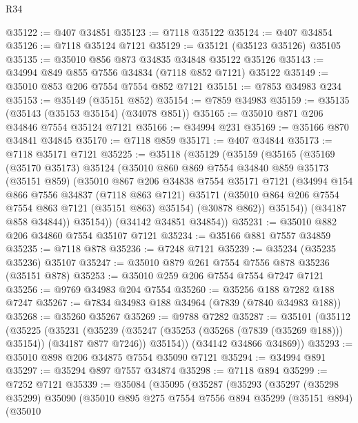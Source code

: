 \begin{lexlean}{R34}
\begin{coremodule}
@35122 := @407 @34851
@35123 := @7118 @35122
@35124 := @407 @34854
@35126 := @7118 @35124 @7121
@35129 := @35121 (@35123 @35126) @35105
@35135 := @35010 @856 @873 @34835 @34848 @35122 @35126
@35143 := @34994 @849 @855 @7556 @34834 (@7118 @852 @7121) @35122
@35149 := @35010 @853 @206 @7554 @7554 @852 @7121
@35151 := @7853 @34983 @234
@35153 := @35149 (@35151 @852)
@35154 := @7859 @34983
@35159 := @35135 (@35143 (@35153 @35154) (@34078 @851))
@35165 := @35010 @871 @206 @34846 @7554 @35124 @7121
@35166 := @34994 @231
@35169 := @35166 @870 @34841 @34845
@35170 := @7118 @859
@35171 := @407 @34844
@35173 := @7118 @35171 @7121
@35225 := @35118
    (@35129
      (@35159
        (@35165
          (@35169
            (@35170 @35173)
            @35124
            (@35010
              @860
              @869
              @7554
              @34840
              @859
              @35173
              (@35151 @859)
              (@35010
                @867
                @206
                @34838
                @7554
                @35171
                @7121
                (@34994
                  @154
                  @866
                  @7556
                  @34837
                  (@7118 @863 @7121)
                  @35171
                  (@35010 @864 @206 @7554 @7554 @863 @7121 (@35151 @863) @35154)
                  (@30878 @862))
                @35154))
            (@34187 @858 @34844))
          @35154))
      (@34142 @34851 @34854))
@35231 := @35010 @882 @206 @34860 @7554 @35107 @7121
@35234 := @35166 @881 @7557 @34859
@35235 := @7118 @878
@35236 := @7248 @7121
@35239 := @35234 (@35235 @35236) @35107
@35247 := @35010 @879 @261 @7554 @7556 @878 @35236 (@35151 @878)
@35253 := @35010 @259 @206 @7554 @7554 @7247 @7121
@35256 := @9769 @34983 @204 @7554
@35260 := @35256 @188 @7282 @188 @7247
@35267 := @7834 @34983 @188 @34964 (@7839 (@7840 @34983 @188))
@35268 := @35260 @35267
@35269 := @9788 @7282
@35287 := @35101
    (@35112
      (@35225
        (@35231
          (@35239 (@35247 (@35253 (@35268 (@7839 (@35269 @188))) @35154)) (@34187 @877 @7246))
          @35154))
      (@34142 @34866 @34869))
@35293 := @35010 @898 @206 @34875 @7554 @35090 @7121
@35294 := @34994 @891
@35297 := @35294 @897 @7557 @34874
@35298 := @7118 @894
@35299 := @7252 @7121
@35339 := @35084
    (@35095
      (@35287
        (@35293
          (@35297
            (@35298 @35299)
            @35090
            (@35010
              @895
              @275
              @7554
              @7556
              @894
              @35299
              (@35151 @894)
              (@35010

\end{coremodule}
\end{lexlean}
